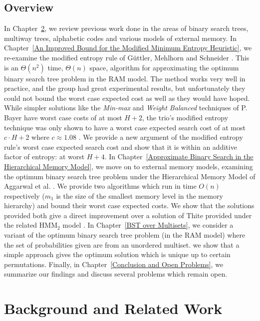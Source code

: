 \documentclass[letterpaper,12pt,titlepage,oneside,final]{book}
\theoremstyle{plain}
\begin{document}
\section{Overview}

In Chapter~\ref{Background and Related Work}, we review previous work done in the areas of binary search trees, multiway trees, alphabetic codes and various models of external memory. In Chapter~\ref{An Improved Bound for the Modified Minimum Entropy Heuristic}, we re-examine the modified entropy rule of G{\"u}ttler, Mehlhorn and Schneider \cite{guttler1980binary}. This is an $\Theta(n^2)$ time, $\Theta(n)$ space, algorithm for approximating the optimum binary search tree problem in the RAM model. The method works very well in practice, and the group had great experimental results, but unfortunately they could not bound the worst case expected cost as well as they would have hoped. While simpler solutions like the \textit{Min-max} and \textit{Weight Balanced} techniques of P. Bayer have worst case costs of at most $H+2$, the trio's modified entropy technique was only shown to have a worst case expected search cost of at most $c\cdot H+2$ where $c \approx 1.08$ \cite{bayer1975improved, guttler1980binary}. We provide a new argument of the modified entropy rule's worst case expected search cost and show that it is within an additive factor of entropy: at worst $H+4$. In Chapter~\ref{Approximate Binary Search in the Hierarchical Memory Model}, we move on to external memory models, examining the optimum binary search tree problem under the Hierarchical Memory Model of Aggarwal et al. \cite{aggarwal1987model}. We provide two algorithms which run in time $O(n)$ respectively ($m_1$ is the size of the smallest memory level in the memory hierarchy) and bound their worst case expected costs. We show that the solutions provided both give a direct improvement over a solution of Thite provided under the related HMM$_2$ model \cite{thite2008optimum}. In Chapter~\ref{BST over Multisets}, we consider a variant of the optimum binary search tree problem (in the RAM model) where the set of probabilities given are from an unordered multiset. we show that a simple approach gives the optimum solution which is unique up to certain permutations. Finally, in Chapter~\ref{Conclusion and Open Problems}, we summarize our findings and discuss several problems which remain open.


\chapter{Background and Related Work} \label{Background and Related Work}
\end{document}
